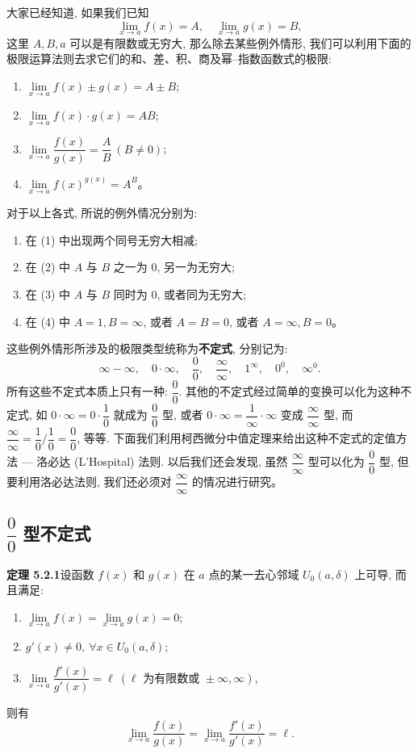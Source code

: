 \documentclass[UTF8,12pt,a4paper,fontset=fandol]{ctexart}
\begin{document}
大家已经知道, 如果我们已知
\[
  \lim_{x\to a}f(x)=A,\quad \lim_{x\to a}g(x)=B,
\]
这里 $A,B,a$ 可以是有限数或无穷大, 那么除去某些例外情形, 我们可以利用下面的极限运算法则去求它们的和、差、积、商及幂--指数函数式的极限:
\begin{enumerate}
  \item $\lim\limits_{x\to a} f(x)\pm g(x)=A\pm B$;
  \item $\lim\limits_{x\to a} f(x)\cdot g(x)=AB$;
  \item $\lim\limits_{x\to a}\dfrac{f(x)}{g(x)}=\dfrac AB\ (B\ne0)$;
  \item $\lim\limits_{x\to a} f(x)^{g(x)}=A^B$。
\end{enumerate}
对于以上各式, 所说的例外情况分别为:
\begin{enumerate}
  \item[(a)] 在 (1) 中出现两个同号无穷大相减;
  \item[(b)] 在 (2) 中 $A$ 与 $B$ 之一为 $0$, 另一为无穷大;
  \item[(c)] 在 (3) 中 $A$ 与 $B$ 同时为 $0$, 或者同为无穷大;
  \item[(d)] 在 (4) 中 $A=1,B=\infty$, 或者 $A=B=0$, 或者 $A=\infty,B=0$。
\end{enumerate}
这些例外情形所涉及的极限类型统称为\textbf{不定式}, 分别记为:
\[
  \infty-\infty,\quad 0\cdot\infty,\quad \frac00,\quad \frac\infty\infty,\quad 1^\infty,\quad 0^0,\quad \infty^0.
\]
所有这些不定式本质上只有一种: $\dfrac00$. 其他的不定式经过简单的变换可以化为这种不定式, 如 $0\cdot\infty=0\cdot\dfrac10$ 就成为 $\dfrac00$ 型, 或者 $0\cdot\infty=\dfrac1\infty\cdot\infty$ 变成 $\dfrac\infty\infty$ 型, 而 $\dfrac\infty\infty=\dfrac10/\dfrac10=\dfrac00$, 等等. 下面我们利用柯西微分中值定理来给出这种不定式的定值方法 --- 洛必达 (L'Hospital) 法则. 以后我们还会发现, 虽然 $\dfrac\infty\infty$ 型可以化为 $\dfrac00$ 型, 但要利用洛必达法则, 我们还必须对 $\dfrac\infty\infty$ 的情况进行研究。

\subsection{$\dfrac00$ 型不定式}

\noindent\textbf{定理 5.2.1}\quad 设函数 $f(x)$ 和 $g(x)$ 在 $a$ 点的某一去心邻域 $U_0(a,\delta)$ 上可导, 而且满足:
\begin{enumerate}
  \item $\lim\limits_{x\to a}f(x)=\lim\limits_{x\to a}g(x)=0$;
  \item $g'(x)\ne0,\ \forall x\in U_0(a,\delta)$;
  \item $\lim\limits_{x\to a}\dfrac{f'(x)}{g'(x)}=\ell\ (\ell\text{ 为有限数或 }\pm\infty,\infty)$,
\end{enumerate}
则有
\[
  \lim_{x\to a}\frac{f(x)}{g(x)}
  =
  \lim_{x\to a}\frac{f'(x)}{g'(x)}
  =
  \ell.
\]
\end{document}
